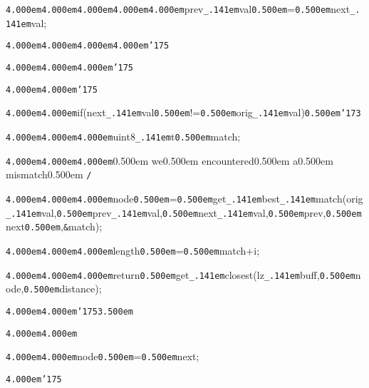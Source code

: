 \noindent
{}{\tt\mc \kern4.000em}{\tt\mc \kern4.000em}{\tt\mc \kern4.000em}{\tt\mc \kern4.000em}{\tt\mc \kern4.000em}prev{\tt\_\kern.141em}val{\tt\mc \kern0.500em}={\tt\mc \kern0.500em}next{\tt\_\kern.141em}val;

\noindent
{}{\tt\mc \kern4.000em}{\tt\mc \kern4.000em}{\tt\mc \kern4.000em}{\tt\mc \kern4.000em}{\tt\char'175}

\noindent
{}{\tt\mc \kern4.000em}{\tt\mc \kern4.000em}{\tt\mc \kern4.000em}{\tt\char'175}

\noindent
{}{\tt\mc \kern4.000em}{\tt\mc \kern4.000em}{\tt\char'175}

\noindent
{}\hfill

\noindent
{}{\tt\mc \kern4.000em}{\tt\mc \kern4.000em}if(next{\tt\_\kern.141em}val{\tt\mc \kern0.500em}!={\tt\mc \kern0.500em}orig{\tt\_\kern.141em}val){\tt\mc \kern0.500em}{\tt\char'173}

\noindent
{}{\tt\mc \kern4.000em}{\tt\mc \kern4.000em}{\tt\mc \kern4.000em}uint8{\tt\_\kern.141em}t{\tt\mc \kern0.500em}match;

\noindent
{}{\tt\mc \kern4.000em}{\tt\mc \kern4.000em}{\tt\mc \kern4.000em}\rm\mc {\tt /}{\tt *}\kern0.500em we\kern0.500em encountered\kern0.500em a\kern0.500em mismatch\kern0.500em {\tt *}{\tt /}
\tt\mc 

\noindent
{}{\tt\mc \kern4.000em}{\tt\mc \kern4.000em}{\tt\mc \kern4.000em}node{\tt\mc \kern0.500em}={\tt\mc \kern0.500em}get{\tt\_\kern.141em}best{\tt\_\kern.141em}match(orig{\tt\_\kern.141em}val,{\tt\mc \kern0.500em}prev{\tt\_\kern.141em}val,{\tt\mc \kern0.500em}next{\tt\_\kern.141em}val,{\tt\mc \kern0.500em}prev,{\tt\mc \kern0.500em}next{\tt\mc \kern0.500em},{\tt\&}match);

\noindent
{}{\tt\mc \kern4.000em}{\tt\mc \kern4.000em}{\tt\mc \kern4.000em}{\tt *}length{\tt\mc \kern0.500em}={\tt\mc \kern0.500em}match+i;

\noindent
{}{\tt\mc \kern4.000em}{\tt\mc \kern4.000em}{\tt\mc \kern4.000em}return{\tt\mc \kern0.500em}get{\tt\_\kern.141em}closest(lz{\tt\_\kern.141em}buff,{\tt\mc \kern0.500em}node,{\tt\mc \kern0.500em}distance);

\noindent
{}{\tt\mc \kern4.000em}{\tt\mc \kern4.000em}{\tt\char'175}{\tt\mc \kern3.500em}

\noindent
{}{\tt\mc \kern4.000em}{\tt\mc \kern4.000em}

\noindent
{}{\tt\mc \kern4.000em}{\tt\mc \kern4.000em}node{\tt\mc \kern0.500em}={\tt\mc \kern0.500em}next;

\noindent
{}{\tt\mc \kern4.000em}{\tt\char'175}

